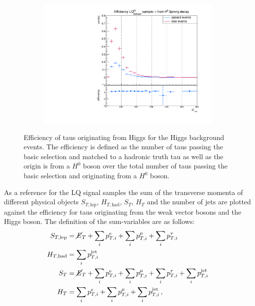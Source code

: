 \begin{figure}
\begin{subfigure}[t]{0.49\textwidth}
                \label{DividedFromH:bg:1prong}
                \end{subfigure}
                \begin{subfigure}[t]{0.49\textwidth}
                \includegraphics[width=\textwidth]{figures/plots/ttH/Divided_fromH3prong.pdf}
                \label{DividedFromH:bg:3prong}
                \end{subfigure}
\caption[Efficiency of taus originating from Higgs bosons for the Higgs background events.]{Efficiency of taus originating from Higgs for the Higgs background events. The efficiency is defined as the number of taus passing the basic selection and matched to a hadronic truth tau as well as the origin is from a $H^0$ boson over the total number of taus passing the basic selection and originating from a $H^0$ boson.}
\label{DividedFromH:bg:ttH}
\end{figure}
%
As a reference for the LQ signal samples the sum of the transverse momenta of different physical objects $S_{T,\text{lep}}$, $H_{T,\text{had}}$, $S_{T}$, $H_{T}$ and the number of jets are plotted against the efficiency for taus originating from the weak vector bosons and the Higgs boson. The definition of the sum-variables are as follows:
\begin{align}
S_{T,\text{lep}}&=\cancel{E}_{T}+\sum_i p_{T,i}^{\text{e}}+\sum_i p_{T,i}^{\mu}+\sum_i p_{T,i}^{\tau} \label{STlepgedöns}\\
H_{T,\text{had}}&=\sum_i p_{T,i}^{\text{jet}} \label{HThadgedöns}\\
S_{T}&=\cancel{E}_{T}+\sum_i p_{T,i}^{\text{e}}+\sum_i p_{T,i}^{\mu}+\sum_i p_{T,i}^{\tau}+\sum_i p_{T,i}^{\text{jet}} \label{STgedöns}\\
H_{T}&=\sum_i p_{T,i}^{\text{e}}+\sum_i p_{T,i}^{\mu}+\sum_i p_{T,i}^{\text{jet}}\,\text{,}
\label{HTgedöns}
\end{align}
